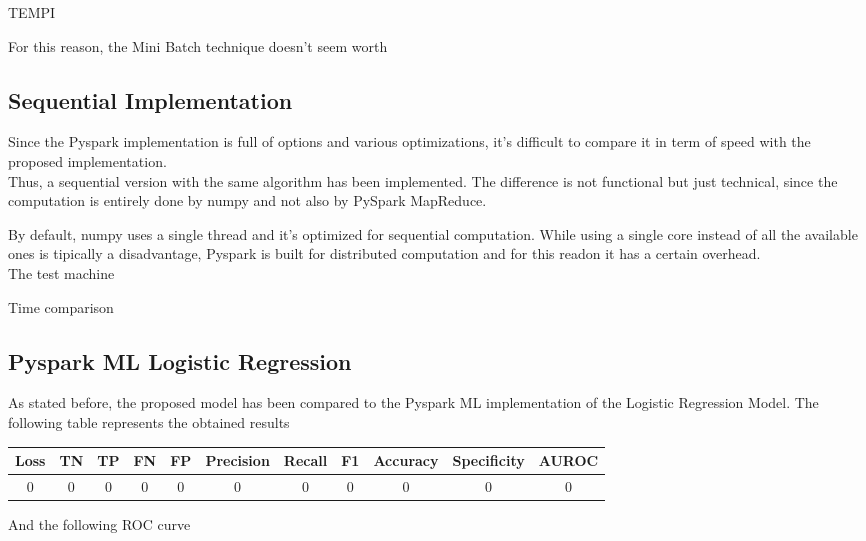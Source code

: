 \documentclass[
	letterpaper, %
	10pt, %
]{class}
\begin{document}
TEMPI

For this reason, the Mini Batch technique doesn't seem worth

\subsection{Sequential Implementation}

Since the Pyspark implementation is full of options and various optimizations, it's difficult to compare it in term of speed with the proposed implementation.\\
Thus, a sequential version with the same algorithm has been implemented. The difference is not functional but just technical, since the computation is entirely done by numpy and not also by PySpark MapReduce.

By default, numpy uses a single thread and it's optimized for sequential computation. While using a single core instead of all the available ones is tipically a disadvantage, Pyspark is built for distributed computation and for this readon it has a certain overhead.\\
The test machine

Time comparison

\subsection{Pyspark ML Logistic Regression}

As stated before, the proposed model has been compared to the Pyspark ML implementation of the Logistic Regression Model.
The following table represents the obtained results

\begin{center}
    \begin{tabular}{ |c|c|c|c|c|c|c|c|c|c|c| }
        \hline
        Loss & TN & TP & FN & FP & Precision & Recall & F1 & Accuracy & Specificity & AUROC \\
        \hline
        0    & 0  & 0  & 0  & 0  & 0         & 0      & 0  & 0        & 0           & 0     \\
        \hline
    \end{tabular}
\end{center}

And the following ROC curve
\end{document}
